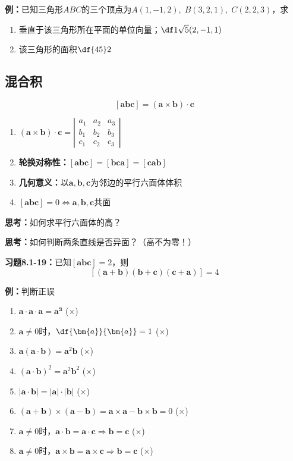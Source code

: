 {\bf 例：}已知三角形$ABC$的三个顶点为$A(1,-1,2),\;B(3,2,1),\;C(2,2,3)$，求
\begin{enumerate}[(1)]
  \setlength{\itemindent}{1cm}
  \item 垂直于该三角形所在平面的单位向量；\hfill $\df1{\sqrt5}(2,-1,1)$
  \item 该三角形的面积\hfill $\df{45}2$
\end{enumerate}

\subsection{混合积}

$$[\bm{abc}]=(\bm{a}\times\bm{b})\cdot\bm{c}$$

\begin{enumerate}[(1)]
  \setlength{\itemindent}{1cm}
  \item $(\bm{a}\times\bm{b})\cdot\bm{c}=
  \left|\begin{array}{ccc}
	a_1 & a_2 & a_3\\
	b_1 & b_2 & b_3\\
	c_1 & c_2 & c_3
	\end{array}\right|$ 
  \item {\bf 轮换对称性：}$[\bm{abc}]=[\bm{bca}] =[\bm{cab}]$ 
  \item {\bf 几何意义：}以$\bm{a},\bm{b},\bm{c}$为邻边的平行六面体体积 
  \item $[\bm{abc}]=0\Leftrightarrow\bm{a},\bm{b},\bm{c}$共面
\end{enumerate}

{\bf 思考：}如何求平行六面体的高？

{\bf 思考：}如何判断两条直线是否异面？\hfill （高不为零！）

{\bf 习题8.1-19：}已知$[\bm{abc}]=2$，则
$$[(\bm{a}+\bm{b})(\bm{b}+\bm{c})(\bm{c}+\bm{a})]=4$$

{\bf 例：}判断正误
\begin{enumerate}[(1)]
  \setlength{\itemindent}{1cm}
  \item $\bm{a}\cdot\bm{a}\cdot\bm{a}=\bm{a^3}$
  \quad(\;${\times}$\;)
  \item $\bm{a}\ne 0$时，$\df{\bm{a}}{\bm{a}}=1$
  \quad(\;${\times}$\;)
  \item $\bm{a}(\bm{a}\cdot\bm{b})=\bm{a}^2\bm{b}$
  \quad(\;${\times}$\;)
  \item $(\bm{a}\cdot\bm{b})^2=\bm{a}^2\bm{b}^2$
  \quad(\;${\times}$\;)
  \item $|\bm{a}\cdot\bm{b}|=|\bm{a}|\cdot|\bm{b}|$
  \quad(\;${\times}$\;)
  \item $(\bm{a}+\bm{b})\times(\bm{a}-\bm{b})=\bm{a}\times\bm{a}
  -\bm{b}\times\bm{b}=0$
  \quad(\;${\times}$\;)
  \item $\bm{a}\ne
  0$时，$\bm{a}\cdot\bm{b}=\bm{a}\cdot\bm{c}\Rightarrow\bm{b}=\bm{c}$
  \quad(\;${\times}$\;)
  \item $\bm{a}\ne
  0$时，$\bm{a}\times\bm{b}=\bm{a}\times\bm{c}\Rightarrow\bm{b}=\bm{c}$
  \quad(\;${\times}$\;)
\end{enumerate}

